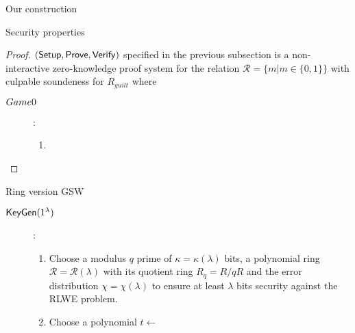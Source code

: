 \begin{section}{Our construction}
\begin{subsection}{Security properties}
    \begin{proof}
      $({\mathsf{Setup}}, {\mathsf{Prove}}, {\mathsf{Verify}})$ specified in the previous subsection is a non-interactive zero-knowledge proof system for the relation $\mathcal{R} = \{ m | m \in \{0,1\}\}$ with culpable soundeness for $R_{guilt}$ where
    	\begin{lemma}
    	  \begin{description}
    	  \item[$\boldmath{Game 0}$] :
    	  \begin{enumerate}
    	  \item 
    	  \end{enumerate}
    	  \end{description}
    	\end{lemma}
    \end{proof}
  \end{subsection}

\begin{subsection}{Ring version GSW}
\begin{description}
\item[${\mathsf{KeyGen}}(1^\lambda)$]:
	\begin{enumerate}
		\item Choose a modulus $q$ prime of $\kappa=\kappa(\lambda)$ bits, a polynomial ring $\mathcal{R} = \mathcal{R}(\lambda)$ with its quotient ring $R_q = R/qR$ and the error distribution $\chi = \chi(\lambda)$ to  ensure at least $\lambda$ bits security against the RLWE problem.
		\item Choose a polynomial $t \gets $
	\end{enumerate}
\end{description}
\end{subsection}



\end{section}
